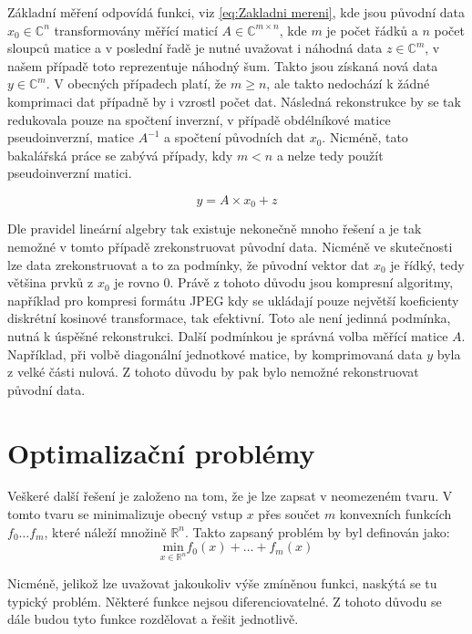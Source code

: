 \documentclass[FM,BP]{tulthesis}
\newcounter{Vzorce}
\begin{document}
Základní měření odpovídá funkci, viz \ref{eq:Zakladni mereni}, kde jsou původní data $x_0 \in \mathbb{C}^n$ transformovány měřící maticí $A \in \mathbb{C} ^{m \times n}$, kde $m$ je počet řádků a $n$ počet sloupců matice a v poslední řadě je nutné uvažovat i náhodná data $z \in \mathbb{C}^m$, v našem případě toto reprezentuje náhodný šum. Takto jsou získaná nová data $y \in \mathbb{C}^m$. V obecných případech platí, že $m \geq n$, ale takto nedochází k žádné komprimaci dat případně by i vzrostl počet dat. Následná rekonstrukce by se tak redukovala pouze na spočtení inverzní, v případě obdélníkové matice pseudoinverzní, matice $A^{-1}$ a spočtení původních dat $x_0$. Nicméně, tato bakalářská práce se zabývá případy, kdy $m < n$ a nelze tedy použít pseudoinverzní matici.

\begin{equation} \label{eq:Zakladni mereni} \tag{Vzorec \theVzorce}
y = A \times x_0 + z
\end{equation}

Dle pravidel lineární algebry tak existuje nekonečně mnoho řešení a je tak nemožné v tomto případě zrekonstruovat původní data. Nicméně ve skutečnosti lze data zrekonstruovat a to za podmínky, že původní vektor dat $x_0$ je řídký, tedy většina prvků z $x_0$ je rovno $0$. Právě z tohoto důvodu jsou kompresní algoritmy, například pro kompresi formátu JPEG kdy se ukládají pouze největší koeficienty diskrétní kosinové transformace, tak efektivní. Toto ale není jedinná podmínka, nutná k úspěšné rekonstrukci. Další podmínkou je správná volba měřící matice $A$. Například, při volbě diagonální jednotkové matice, by komprimovaná data $y$ byla z velké části nulová. Z tohoto důvodu by pak bylo nemožné rekonstruovat původní data.

\chapter{Optimalizační problémy}
Veškeré další řešení je založeno na tom, že je lze zapsat v neomezeném tvaru. V tomto tvaru se minimalizuje obecný vstup $x$ přes součet $m$ konvexních funkcích $f_0 \ldots f_m$, které náleží množině $\mathbb{R}^n$. Takto zapsaný problém by byl definován jako:
\begin{equation} \label{eq:Obecny problem} \tag{Vzorec \theVzorce}
\underset{x \in \mathbb{R}^n} {\mathrm{min}} f_{0}(x)+\ldots+f_{m}(x)
\end{equation}

Nicméně, jelikož lze uvažovat jakoukoliv výše zmíněnou funkci, naskýtá se tu typický problém. Některé funkce nejsou diferenciovatelné. Z tohoto důvodu se dále budou tyto funkce rozdělovat a řešit jednotlivě. 
\end{document}

